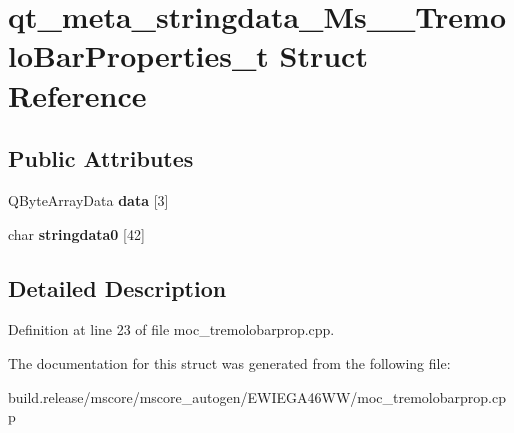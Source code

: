 \hypertarget{structqt__meta__stringdata___ms_____tremolo_bar_properties__t}{}\section{qt\+\_\+meta\+\_\+stringdata\+\_\+\+Ms\+\_\+\+\_\+\+Tremolo\+Bar\+Properties\+\_\+t Struct Reference}
\label{structqt__meta__stringdata___ms_____tremolo_bar_properties__t}
\subsection*{Public Attributes}
\begin{DoxyCompactItemize}
\item 
\mbox{\label{structqt__meta__stringdata___ms_____tremolo_bar_properties__t_aa4fd6b2cbf3cf739bad3e5dc547844fe}} 
Q\+Byte\+Array\+Data {\bfseries data} \mbox{[}3\mbox{]}
\item 
\mbox{\label{structqt__meta__stringdata___ms_____tremolo_bar_properties__t_a09dd950416db8bd41b7afb9869782a23}} 
char {\bfseries stringdata0} \mbox{[}42\mbox{]}
\end{DoxyCompactItemize}


\subsection{Detailed Description}


Definition at line 23 of file moc\+\_\+tremolobarprop.\+cpp.



The documentation for this struct was generated from the following file\+:\begin{DoxyCompactItemize}
\item 
build.\+release/mscore/mscore\+\_\+autogen/\+E\+W\+I\+E\+G\+A46\+W\+W/moc\+\_\+tremolobarprop.\+cpp\end{DoxyCompactItemize}
